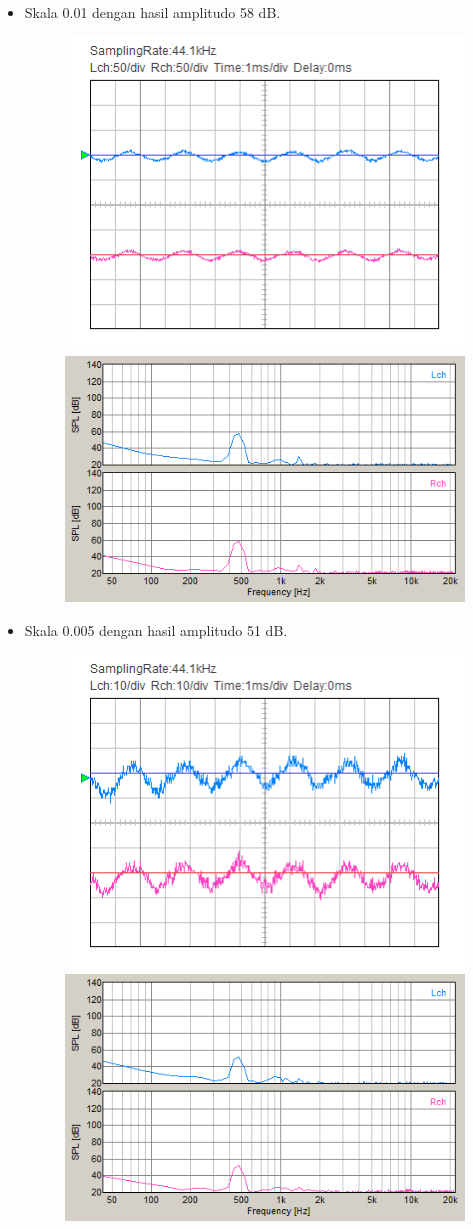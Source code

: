\documentclass[12pt,]{article}
\begin{document}
\begin{itemize}
		\item Skala 0.01 dengan hasil amplitudo 58 dB.
		\begin{figure}[H]
			\centering
			\includegraphics[width=0.45\linewidth]{result/day_4/500Hz/tone001}
			\includegraphics[width=0.45\linewidth]{result/day_4/500Hz/fft_tone001}
		\end{figure}

		\newpage
		\item Skala 0.005 dengan hasil amplitudo 51 dB.
		\begin{figure}[H]
			\centering
			\includegraphics[width=0.45\linewidth]{result/day_4/500Hz/tone0005}
			\includegraphics[width=0.45\linewidth]{result/day_4/500Hz/fft_tone0005}
		\end{figure}


\end{itemize}
\end{document}
